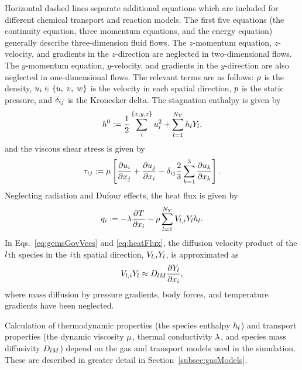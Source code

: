 %
Horizontal dashed lines separate additional equations which are included for different chemical transport and reaction models. The first five equations (the continuity equation, three momentum equations, and the energy equation) generally describe three-dimension fluid flows. The $z$-momentum equation, $z$-velocity, and gradients in the $z$-direction are neglected in two-dimensional flows. The $y$-momentum equation, $y$-velocity, and gradients in the $y$-direction are also neglected in one-dimensional flows. The relevant terms are as follows: $\rho$ is the density, $u_{i} \in \{u, \; v, \; w\}$ is the velocity in each spatial direction, $p$ is the static pressure, and $\delta_{i j}$ is the Kronecker delta. The stagnation enthalpy is given by
%
\begin{equation}\label{eq:stagEnth}
	h^0 := \frac{1}{2} \sum_{i}^{\{x,y,z\}} u_{i}^2 + \sum_{l = 1}^{N_Y} h_{l} Y_{l},
\end{equation}
%
and the viscous shear stress is given by
%
\begin{equation}\label{eq:shearStress}
	\tau_{i j} := \mu \left[ \frac{\partial u_{i}}{\partial x_{j}} + \frac{\partial u_{j}}{\partial x_{i}} - \delta_{i j} \frac{2}{3} \sum_{k=1}^3 \frac{\partial u_{k}}{\partial x_{k}} \right].
\end{equation}
%
Neglecting radiation and Dufour effects, the heat flux is given by
%
\begin{equation}\label{eq:heatFlux}
	q_{i} := -\lambda \frac{\partial T}{\partial x_{i}} - \rho \sum_{l = 1}^{N_Y} V_{l,i} Y_{l} h_{l}.
\end{equation}
%
In Eqs.~\ref{eq:gemsGovVecs} and \ref{eq:heatFlux}, the diffusion velocity product of the $l$th species in the $i$th spatial direction, $V_{l,i} Y_{l}$, is approximated as
%
\begin{equation}
	V_{l,i} Y_{l} \approx D_{l M} \frac{\partial Y_{l}}{\partial x_{i}},
\end{equation}
%
where mass diffusion by pressure gradients, body forces, and temperature gradients have been neglected.

Calculation of thermodynamic properties (the species enthalpy $h_{l}$) and transport properties (the dynamic viscosity $\mu$, thermal conductivity $\lambda$, and species mass diffusivity $D_{l M}$) depend on the gas and transport models used in the simulation. These are described in greater detail in Section~\ref{subsec:gasModels}.

